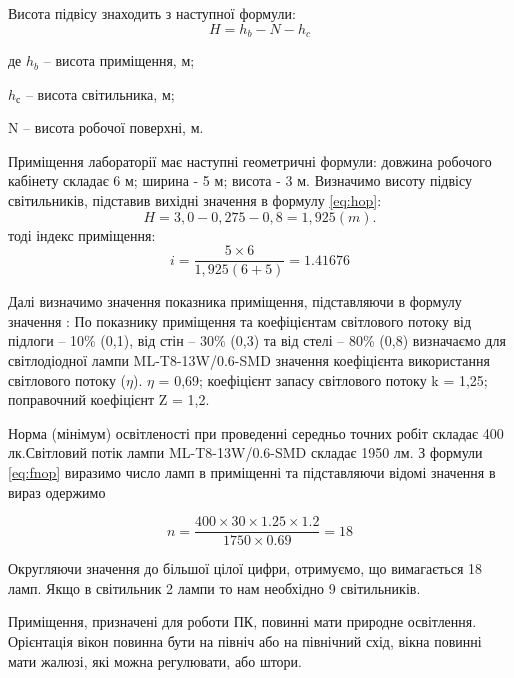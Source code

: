 Висота підвісу знаходить з наступної формули:
\begin{equation}
\label{eq:hop}
 H =h_{b} - N - h_{c} 
\end{equation}   
\begin{ESKDexplanation}
\item де $h_{b}$ – висота приміщення, м;
\item $h_{с}$ – висота світильника, м;
\item N – висота робочої поверхні, м.
\end{ESKDexplanation}
Приміщення лабораторії має наступні геометричні формули: довжина робочого кабінету складає 6 м;
ширина - 5 м; висота - 3 м. Визначимо висоту підвісу світильників, підставив вихідні значення в формулу \ref{eq:hop}:
\begin{equation}
 H =   3,0 - 0,275 - 0,8 = 1,925(m).
\end{equation}
тоді індекс приміщення:
\begin{equation*}
 i =  \frac{5 \times 6}{1,925(6+5)}= 1.41676
\end{equation*}            

Далі визначимо значення показника приміщення, підставляючи в формулу значення :       
По показнику приміщення та коефіцієнтам світлового потоку від підлоги – 10\% (0,1), від стін – 30\% (0,3) та від стелі – 80\% (0,8)
визначаємо для світлодіодної лампи ML-T8-13W/0.6-SMD значення коефіцієнта використання світлового потоку ($\eta$). $\eta$ = 0,69; коефіцієнт запасу світлового потоку k = 1,25; поправочний коефіцієнт Z = 1,2. 

Норма (мінімум) освітленості при проведенні середньо точних робіт складає 400 лк.Світловий потік лампи ML-T8-13W/0.6-SMD складає 1950 лм. З формули \ref{eq:fnop} виразимо число ламп в приміщенні та підставляючи відомі значення в вираз одержимо
 
\begin{equation}
 n = \frac{400 \times 30 \times 1.25 \times 1.2 }{1750 \times 0.69} = 18
\end{equation}

Округляючи значення до більшої цілої цифри, отримуємо, що вимагається 18 ламп. Якщо в світильник 2 лампи то нам необхідно 9 світильників.

 Приміщення, призначені для роботи ПК, повинні мати природне освітлення. Орієнтація вікон повинна бути на північ або на північний схід, вікна повинні мати жалюзі, які можна регулювати, або штори.

